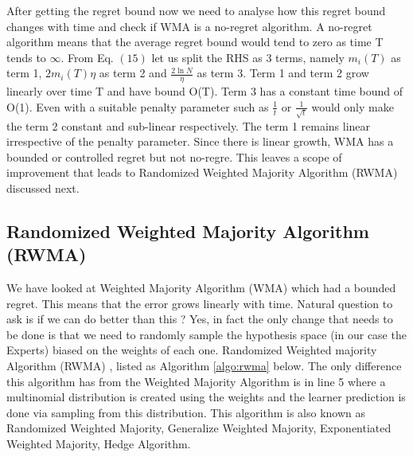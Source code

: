 \documentclass[11pt]{article}
\begin{document}
After getting the regret bound now we need to analyse how this regret bound changes with time and check if WMA is a no-regret algorithm. A no-regret algorithm means that the average regret bound would tend to zero as time T tends to $\infty$. From Eq. $(15)$ let us split the RHS as 3 terms, namely $m_i{(T)}$ as term 1, $2m_i{(T)}\eta$ as term 2 and $\frac{2\ln N}{\eta}$ as term 3. Term 1 and term 2 grow linearly over time T and have bound O(T). Term 3 has a constant time bound of O(1). Even with a suitable penalty parameter such as  $\frac{1}{t}$ or  $\frac{1}{\sqrt{t}}$ would only make the term 2 constant and sub-linear respectively. The term 1 remains linear irrespective of the penalty parameter. Since there is linear growth, WMA has a bounded or controlled regret but not no-regre. This leaves a scope of improvement that leads to Randomized Weighted Majority Algorithm (RWMA) discussed next.

\subsection{Randomized Weighted Majority Algorithm (RWMA)}
 
We have looked at Weighted Majority Algorithm (WMA) which had a bounded regret. This means that the error grows linearly with time. Natural question to ask is if we can do better than this ? Yes, in fact the only change that needs to be done is that we need to randomly sample the hypothesis space (in our case the Experts) biased on the weights of each one.
Randomized Weighted majority Algorithm (RWMA) \cite{LITTLESTONE1994212}, listed as Algorithm \ref{algo:rwma} below. The only difference this algorithm has from the Weighted Majority Algorithm is in line 5 where a multinomial distribution is created using the weights and the learner prediction is done via sampling from this distribution. This algorithm is also known as Randomized Weighted Majority, Generalize Weighted Majority, Exponentiated Weighted Majority, Hedge Algorithm. 
\end{document}
